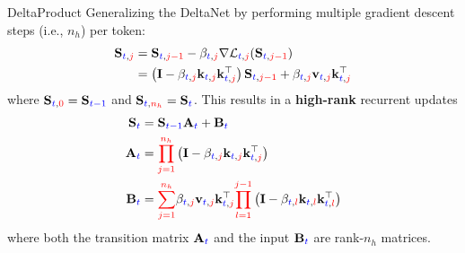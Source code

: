 \begin{frame}{DeltaProduct}
    Generalizing the DeltaNet by performing {\color{red}multiple gradient descent steps} (i.e., $n_h$) {\color{blue}per token}:
    \[
    \begin{aligned}
        \mathbf{S}_{{\color{blue}t},{\color{red}j}} &= \mathbf{S}_{{\color{blue}t},{\color{red}j-1}} - \beta_{{\color{blue}t},{\color{red}j}}\nabla\mathcal{L}_{{\color{blue}t},{\color{red}j}}(\mathbf{S}_{{\color{blue}t},{\color{red}j-1}}) \\
        &= \left(\mathbf{I} - \beta_{{\color{blue}t},{\color{red}j}}\mathbf{k}_{{\color{blue}t},{\color{red}j}}\mathbf{k}_{{\color{blue}t},{\color{red}j}}^\top\right)\mathbf{S}_{{\color{blue}t},{\color{red}j-1}} + \beta_{{\color{blue}t},{\color{red}j}}\mathbf{v}_{{\color{blue}t},{\color{red}j}}\mathbf{k}_{{\color{blue}t},{\color{red}j}}^\top
    \end{aligned}
    \]
    where $\mathbf{S}_{{\color{blue}t},{\color{red}0}} = \mathbf{S}_{{\color{blue}t-1}}$ and $\mathbf{S}_{{\color{blue}t},{\color{red}n_h}} = \mathbf{S}_{{\color{blue}t}}$. This results in a \textbf{high-rank} recurrent updates
    \[
    \begin{aligned}
        \mathbf{S}_{\color{blue}t} &= \mathbf{S}_{\color{blue}t-1} \mathbf{A}_{\color{blue}t} + \mathbf{B}_{\color{blue}t} \\
        \mathbf{A}_{\color{blue}t} &= {\color{red}\prod_{j=1}^{n_h}} \left(\mathbf{I} - \beta_{{\color{blue}t}, {\color{red} j}} \mathbf{k}_{{\color{blue}t}, {\color{red} j}} \mathbf{k}_{{\color{blue}t}, {\color{red} j}}^\top\right) \\
        \mathbf{B}_{\color{blue}t} &= {\color{red}\sum_{j=1}^{n_h}} \beta_{{\color{blue}t}, {\color{red} j}} \mathbf{v}_{{\color{blue}t}, {\color{red} j}} \mathbf{k}_{{\color{blue}t}, {\color{red} j}}^\top {\color{red}\prod_{l=1}^{j-1}} \left(\mathbf{I} - \beta_{{\color{blue}t}, {\color{red} l}} \mathbf{k}_{{\color{blue}t}, {\color{red} l}} \mathbf{k}_{{\color{blue}t}, {\color{red} l}}^\top\right)
    \end{aligned}
    \]
    where both the transition matrix $\mathbf{A}_{\color{blue}t}$ and the input $\mathbf{B}_{\color{blue}t}$ are rank-$n_h$ matrices.
\end{frame}

